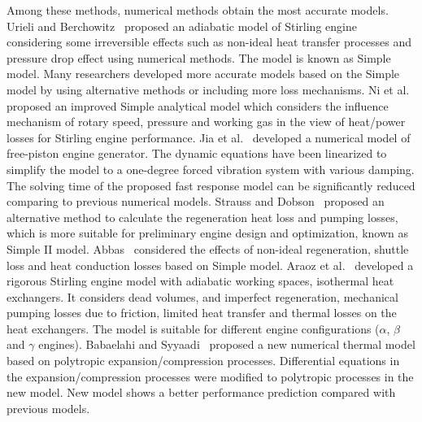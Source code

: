Among these methods, numerical methods obtain the most accurate models. Urieli and Berchowitz~\cite{Urieli1984} proposed an adiabatic model of Stirling engine considering some irreversible effects such as non-ideal heat transfer processes and pressure drop effect using numerical methods. The model is known as Simple model. Many researchers developed more accurate models based on the Simple model by using alternative methods or including more loss mechanisms.
Ni et al.~\cite{Ni2016} proposed an improved Simple analytical model which considers the influence mechanism of rotary speed, pressure and working gas in the view of heat/power losses for Stirling engine performance.
Jia et al.~\cite{Jia2016} developed a numerical model of free-piston engine generator. The dynamic equations have been linearized to simplify the model to a one-degree forced vibration system with various damping. The solving time of the proposed fast response model can be significantly reduced comparing to previous numerical models.
Strauss and Dobson~\cite{Strauss2010} proposed an alternative method to calculate the regeneration heat loss and pumping losses, which is more suitable for preliminary engine design and optimization, known as Simple II model.
Abbas~\cite{Abbas2014} considered the effects of non-ideal regeneration, shuttle loss and heat conduction losses based on Simple model.
Araoz et al.~\cite{Araoz2015} developed a rigorous Stirling engine model with adiabatic working spaces, isothermal heat exchangers. It considers dead volumes, and imperfect regeneration, mechanical pumping losses due to friction, limited heat transfer and thermal losses on the heat exchangers. The model is suitable for different engine configurations ($\alpha$, $\beta$ and $\gamma$ engines).
Babaelahi and Syyaadi~\cite{Babaelahi2015} proposed a new numerical thermal model based on polytropic expansion/compression processes. Differential equations in the expansion/compression processes were modified to polytropic processes in the new model. New model shows a better performance prediction compared with previous models.

